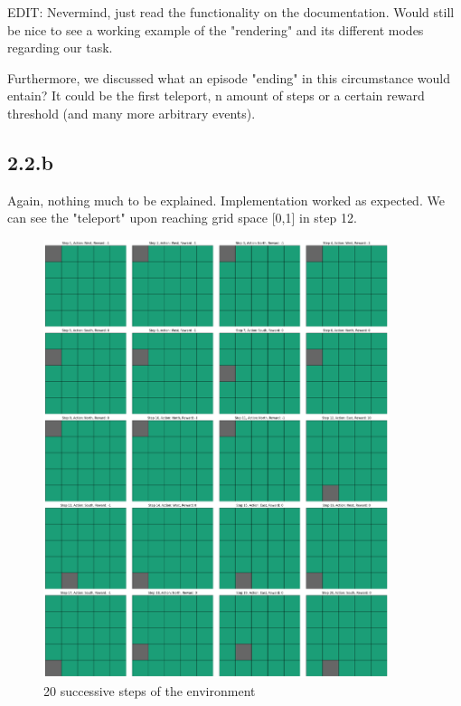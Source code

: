 \documentclass{article} %
\begin{document}
	EDIT: Nevermind, just read the functionality on the documentation. Would still be nice to see a working example of the "rendering" and its different modes regarding our task.
	
	Furthermore, we discussed what an episode "ending" in this circumstance would entain? It could be the first teleport, n amount of steps or a certain reward threshold (and many more arbitrary events).
	
	\subsection{2.2.b}
	Again, nothing much to be explained. Implementation worked as expected. We can see the "teleport" upon reaching grid space [0,1] in step 12. 
	
	\begin{figure}[h!]
		\centering
		\includegraphics[width=0.9\textwidth]{images/20_steps.png}
		\caption{20 successive steps of the environment}
		\label{fig:1.1.a.1}
	\end{figure}
	
	
\end{document}
